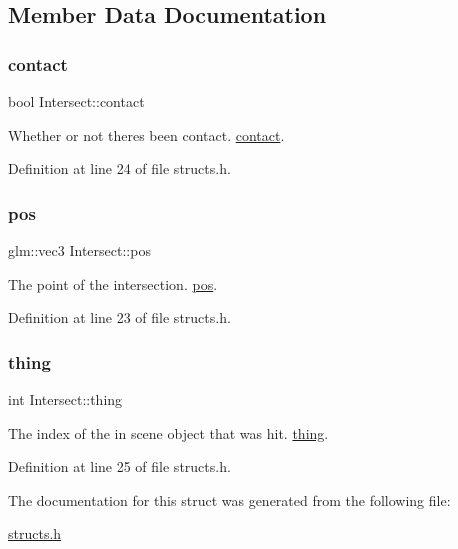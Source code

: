 \subsection{Member Data Documentation}
\mbox{\label{struct_intersect_a804dc874077e6140a02aeddcfa992892}} 
\subsubsection{\texorpdfstring{contact}{contact}}
{\footnotesize\ttfamily bool Intersect\+::contact}



Whether or not there\textquotesingle{}s been contact. \mbox{\hyperlink{struct_intersect_a804dc874077e6140a02aeddcfa992892}{contact}}. 



Definition at line 24 of file structs.\+h.

\mbox{\label{struct_intersect_acac3d72036e36079b68fdfecf071785c}} 
\subsubsection{\texorpdfstring{pos}{pos}}
{\footnotesize\ttfamily glm\+::vec3 Intersect\+::pos}



The point of the intersection. \mbox{\hyperlink{struct_intersect_acac3d72036e36079b68fdfecf071785c}{pos}}. 



Definition at line 23 of file structs.\+h.

\mbox{\label{struct_intersect_a0db00f51f704942fd24de64379a74c28}} 
\subsubsection{\texorpdfstring{thing}{thing}}
{\footnotesize\ttfamily int Intersect\+::thing}



The index of the in scene object that was hit. \mbox{\hyperlink{struct_intersect_a0db00f51f704942fd24de64379a74c28}{thing}}. 



Definition at line 25 of file structs.\+h.



The documentation for this struct was generated from the following file\+:\begin{DoxyCompactItemize}
\item 
\mbox{\hyperlink{structs_8h}{structs.\+h}}\end{DoxyCompactItemize}
